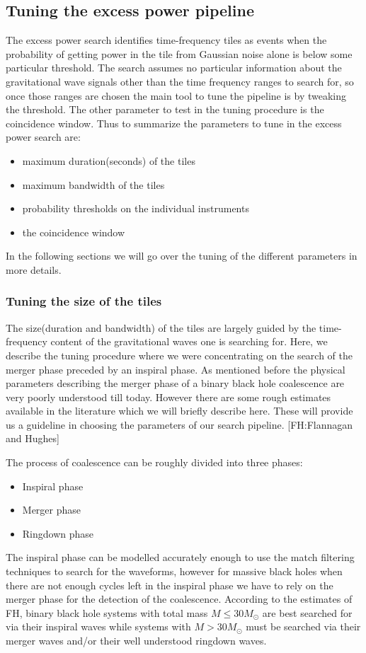 \documentclass{article}
\begin{document}
\subsection{Tuning the excess power pipeline}


The excess power search identifies time-frequency tiles as events when the 
probability of getting power in the tile from Gaussian noise alone
is below some particular threshold.  The search assumes no particular 
information about the gravitational wave signals other than the time
frequency ranges to search for,  so once those ranges are chosen the main 
tool to tune the pipeline is by tweaking the threshold.  The other parameter 
to test in the tuning procedure is the coincidence window.  Thus to 
summarize the parameters to tune in the excess power search are:
\begin{itemize}
\item maximum duration(seconds) of the tiles
\item maximum bandwidth of the tiles
\item probability thresholds on the individual instruments
\item the coincidence window
\end{itemize}
In the following sections we will go over the tuning of the different 
parameters in more details.


\subsubsection{Tuning the size of the tiles}
\label{section:tunetilesize}


The size(duration and bandwidth) of the tiles are largely guided by the
time-frequency content of the gravitational waves one is searching for.
  Here,  we describe the tuning procedure where we were concentrating 
on the search of the merger phase preceded by an inspiral phase.  As
mentioned before the physical parameters describing the merger phase
of a binary black hole coalescence are very poorly understood till
today.  However there are some rough estimates available in the literature 
which we will briefly describe here.  These will provide us a guideline
in choosing the parameters of our search pipeline. [FH:Flannagan and Hughes]

The process of coalescence can be roughly divided into three phases:
\begin{itemize}
\item Inspiral phase
\item Merger phase
\item Ringdown phase
\end{itemize}
The inspiral phase can be modelled accurately enough to use the match
filtering techniques to search for the waveforms, however for massive
black holes when there are not enough cycles left in the inspiral phase 
we have to rely on the merger phase for the detection of the coalescence.
According to the estimates of FH, binary black hole systems with total
mass $M \leq 30M_{\odot}$ are best searched for via their inspiral waves
while systems with $M > 30M_{\odot}$ must be searched via their
merger waves and/or their well understood ringdown waves.  
\end{document}
